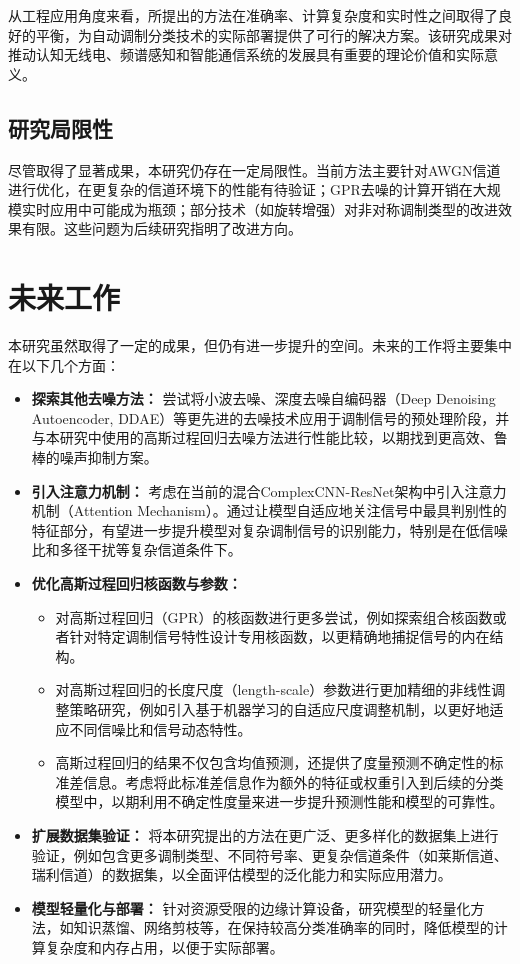 \documentclass[conference]{IEEEtran}
\begin{document}
从工程应用角度来看，所提出的方法在准确率、计算复杂度和实时性之间取得了良好的平衡，为自动调制分类技术的实际部署提供了可行的解决方案。该研究成果对推动认知无线电、频谱感知和智能通信系统的发展具有重要的理论价值和实际意义。

\subsection{研究局限性}

尽管取得了显著成果，本研究仍存在一定局限性。当前方法主要针对AWGN信道进行优化，在更复杂的信道环境下的性能有待验证；GPR去噪的计算开销在大规模实时应用中可能成为瓶颈；部分技术（如旋转增强）对非对称调制类型的改进效果有限。这些问题为后续研究指明了改进方向。

\section{未来工作}
本研究虽然取得了一定的成果，但仍有进一步提升的空间。未来的工作将主要集中在以下几个方面：

\begin{itemize}
    \item \textbf{探索其他去噪方法：} 尝试将小波去噪、深度去噪自编码器（Deep Denoising Autoencoder, DDAE）等更先进的去噪技术应用于调制信号的预处理阶段，并与本研究中使用的高斯过程回归去噪方法进行性能比较，以期找到更高效、鲁棒的噪声抑制方案。
    \item \textbf{引入注意力机制：} 考虑在当前的混合ComplexCNN-ResNet架构中引入注意力机制（Attention Mechanism）。通过让模型自适应地关注信号中最具判别性的特征部分，有望进一步提升模型对复杂调制信号的识别能力，特别是在低信噪比和多径干扰等复杂信道条件下。
    \item \textbf{优化高斯过程回归核函数与参数：}
    \begin{itemize}
        \item 对高斯过程回归（GPR）的核函数进行更多尝试，例如探索组合核函数或者针对特定调制信号特性设计专用核函数，以更精确地捕捉信号的内在结构。
        \item 对高斯过程回归的长度尺度（length-scale）参数进行更加精细的非线性调整策略研究，例如引入基于机器学习的自适应尺度调整机制，以更好地适应不同信噪比和信号动态特性。
        \item 高斯过程回归的结果不仅包含均值预测，还提供了度量预测不确定性的标准差信息。考虑将此标准差信息作为额外的特征或权重引入到后续的分类模型中，以期利用不确定性度量来进一步提升预测性能和模型的可靠性。
    \end{itemize}
    \item \textbf{扩展数据集验证：} 将本研究提出的方法在更广泛、更多样化的数据集上进行验证，例如包含更多调制类型、不同符号率、更复杂信道条件（如莱斯信道、瑞利信道）的数据集，以全面评估模型的泛化能力和实际应用潜力。
    \item \textbf{模型轻量化与部署：} 针对资源受限的边缘计算设备，研究模型的轻量化方法，如知识蒸馏、网络剪枝等，在保持较高分类准确率的同时，降低模型的计算复杂度和内存占用，以便于实际部署。
\end{itemize}
\end{document}
